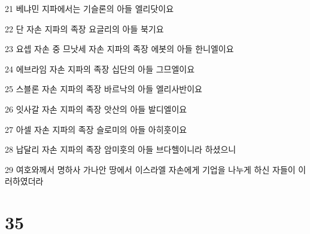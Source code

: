 \par 21 베냐민 지파에서는 기슬론의 아들 엘리닷이요
\par 22 단 자손 지파의 족장 요글리의 아들 북기요
\par 23 요셉 자손 중 므낫세 자손 지파의 족장 에봇의 아들 한니엘이요
\par 24 에브라임 자손 지파의 족장 십단의 아들 그므엘이요
\par 25 스블론 자손 지파의 족장 바르낙의 아들 엘리사반이요
\par 26 잇사갈 자손 지파의 족장 앗산의 아들 발디엘이요
\par 27 아셀 자손 지파의 족장 슬로미의 아들 아히훗이요
\par 28 납달리 자손 지파의 족장 암미훗의 아들 브다헬이니라 하셨으니
\par 29 여호와께서 명하사 가나안 땅에서 이스라엘 자손에게 기업을 나누게 하신 자들이 이러하였더라

\chapter{35}

